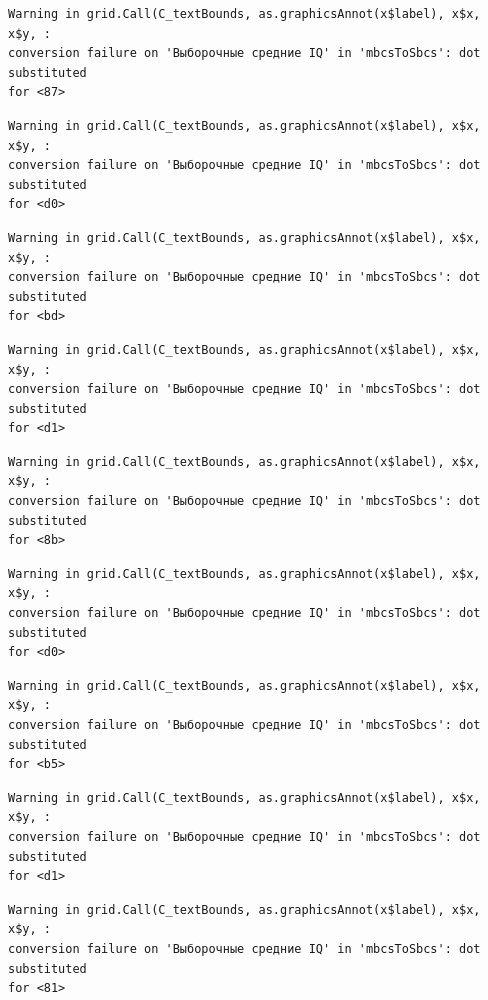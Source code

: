 \documentclass[
  letterpaper,
  DIV=11,
  numbers=noendperiod]{scrreprt}
\theoremstyle{definition}
\theoremstyle{remark}
\begin{document}
\begin{verbatim}
Warning in grid.Call(C_textBounds, as.graphicsAnnot(x$label), x$x, x$y, :
conversion failure on 'Выборочные средние IQ' in 'mbcsToSbcs': dot substituted
for <87>
\end{verbatim}

\begin{verbatim}
Warning in grid.Call(C_textBounds, as.graphicsAnnot(x$label), x$x, x$y, :
conversion failure on 'Выборочные средние IQ' in 'mbcsToSbcs': dot substituted
for <d0>
\end{verbatim}

\begin{verbatim}
Warning in grid.Call(C_textBounds, as.graphicsAnnot(x$label), x$x, x$y, :
conversion failure on 'Выборочные средние IQ' in 'mbcsToSbcs': dot substituted
for <bd>
\end{verbatim}

\begin{verbatim}
Warning in grid.Call(C_textBounds, as.graphicsAnnot(x$label), x$x, x$y, :
conversion failure on 'Выборочные средние IQ' in 'mbcsToSbcs': dot substituted
for <d1>
\end{verbatim}

\begin{verbatim}
Warning in grid.Call(C_textBounds, as.graphicsAnnot(x$label), x$x, x$y, :
conversion failure on 'Выборочные средние IQ' in 'mbcsToSbcs': dot substituted
for <8b>
\end{verbatim}

\begin{verbatim}
Warning in grid.Call(C_textBounds, as.graphicsAnnot(x$label), x$x, x$y, :
conversion failure on 'Выборочные средние IQ' in 'mbcsToSbcs': dot substituted
for <d0>
\end{verbatim}

\begin{verbatim}
Warning in grid.Call(C_textBounds, as.graphicsAnnot(x$label), x$x, x$y, :
conversion failure on 'Выборочные средние IQ' in 'mbcsToSbcs': dot substituted
for <b5>
\end{verbatim}

\begin{verbatim}
Warning in grid.Call(C_textBounds, as.graphicsAnnot(x$label), x$x, x$y, :
conversion failure on 'Выборочные средние IQ' in 'mbcsToSbcs': dot substituted
for <d1>
\end{verbatim}

\begin{verbatim}
Warning in grid.Call(C_textBounds, as.graphicsAnnot(x$label), x$x, x$y, :
conversion failure on 'Выборочные средние IQ' in 'mbcsToSbcs': dot substituted
for <81>
\end{verbatim}
\end{document}
